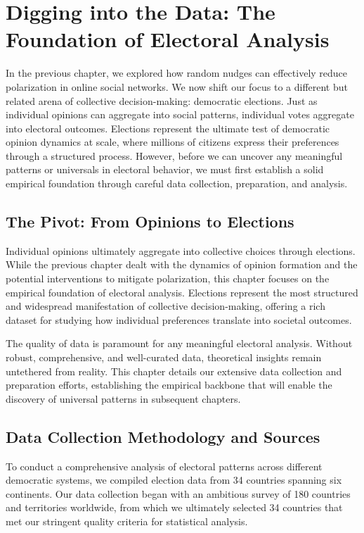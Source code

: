 \chapter{Digging into the Data: The Foundation of Electoral Analysis}
\label{chap3}

In the previous chapter, we explored how random nudges can effectively reduce polarization in online social networks. We now shift our focus to a different but related arena of collective decision-making: democratic elections. Just as individual opinions can aggregate into social patterns, individual votes aggregate into electoral outcomes. Elections represent the ultimate test of democratic opinion dynamics at scale, where millions of citizens express their preferences through a structured process. However, before we can uncover any meaningful patterns or universals in electoral behavior, we must first establish a solid empirical foundation through careful data collection, preparation, and analysis.

\section{The Pivot: From Opinions to Elections}

Individual opinions ultimately aggregate into collective choices through elections. While the previous chapter dealt with the dynamics of opinion formation and the potential interventions to mitigate polarization, this chapter focuses on the empirical foundation of electoral analysis. Elections represent the most structured and widespread manifestation of collective decision-making, offering a rich dataset for studying how individual preferences translate into societal outcomes.

The quality of data is paramount for any meaningful electoral analysis. Without robust, comprehensive, and well-curated data, theoretical insights remain untethered from reality. This chapter details our extensive data collection and preparation efforts, establishing the empirical backbone that will enable the discovery of universal patterns in subsequent chapters.

\section{Data Collection Methodology and Sources}

To conduct a comprehensive analysis of electoral patterns across different democratic systems, we compiled election data from 34 countries spanning six continents. Our data collection began with an ambitious survey of 180 countries and territories worldwide, from which we ultimately selected 34 countries that met our stringent quality criteria for statistical analysis.

